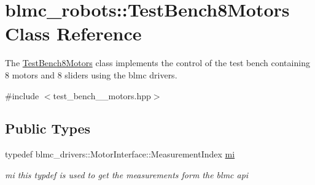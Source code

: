 \hypertarget{classblmc__robots_1_1TestBench8Motors}{}\section{blmc\+\_\+robots\+:\+:Test\+Bench8\+Motors Class Reference}
\label{classblmc__robots_1_1TestBench8Motors}


The \hyperlink{classblmc__robots_1_1TestBench8Motors}{Test\+Bench8\+Motors} class implements the control of the test bench containing 8 motors and 8 sliders using the blmc drivers.  




{\ttfamily \#include $<$test\+\_\+bench\+\_\+\_\+motors.\+hpp$>$}

\subsection*{Public Types}
\begin{DoxyCompactItemize}
\item 
\mbox{\label{classblmc__robots_1_1TestBench8Motors_a049fd1c22b23b81372f2a57a03bf1303}} 
typedef blmc\+\_\+drivers\+::\+Motor\+Interface\+::\+Measurement\+Index \hyperlink{classblmc__robots_1_1TestBench8Motors_a049fd1c22b23b81372f2a57a03bf1303}{mi}
\begin{DoxyCompactList}\small\item\em mi this typdef is used to get the measurements form the blmc api \end{DoxyCompactList}\end{DoxyCompactItemize}
